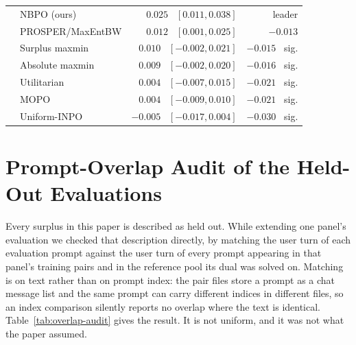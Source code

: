 \documentclass{article}
\theoremstyle{remark}
\theoremstyle{plain}
\newcommand{\NBPO}{\textsc{NBPO}}
\begin{document}
\begin{table}[htbp]
\begin{tabular}{llrr}
\midrule
{}
 & \NBPO{} (ours) & $0.025$ \ $[0.011, 0.038]$ & leader\\
 & PROSPER/MaxEntBW & $0.012$ \ $[0.001, 0.025]$ & $-0.013$\\
 & Surplus maxmin & $0.010$ \ $[-0.002, 0.021]$ & $-0.015$ \ sig.\\
 & Absolute maxmin & $0.009$ \ $[-0.002, 0.020]$ & $-0.016$ \ sig.\\
 & Utilitarian & $0.004$ \ $[-0.007, 0.015]$ & $-0.021$ \ sig.\\
 & MOPO & $0.004$ \ $[-0.009, 0.010]$ & $-0.021$ \ sig.\\
 & Uniform-INPO & $-0.005$ \ $[-0.017, 0.004]$ & $-0.030$ \ sig.\\
\bottomrule
\end{tabular}
\end{table}


\section{Prompt-Overlap Audit of the Held-Out Evaluations}
\label{app:overlap}
Every surplus in this paper is described as held out. While extending one panel's evaluation we checked
that description directly, by matching the user turn of each evaluation prompt against the user turn of
every prompt appearing in that panel's training pairs and in the reference pool its dual was solved on.
Matching is on text rather than on prompt index: the pair files store a prompt as a chat message list and
the same prompt can carry different indices in different files, so an index comparison silently reports no
overlap where the text is identical. Table~\ref{tab:overlap-audit} gives the result. It is not uniform, and
it was not what the paper assumed.
\end{document}
